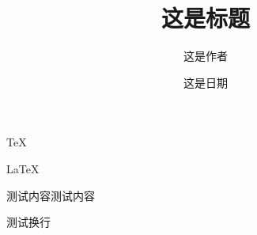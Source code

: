 \documentclass[UTF8,a4paper]{ctexart}
\title{这是标题}
\author{这是作者}
\date{这是日期}
\begin{document}
\maketitle

\TeX

\LaTeX

测试内容测试内容

测试换行
\end{document}

